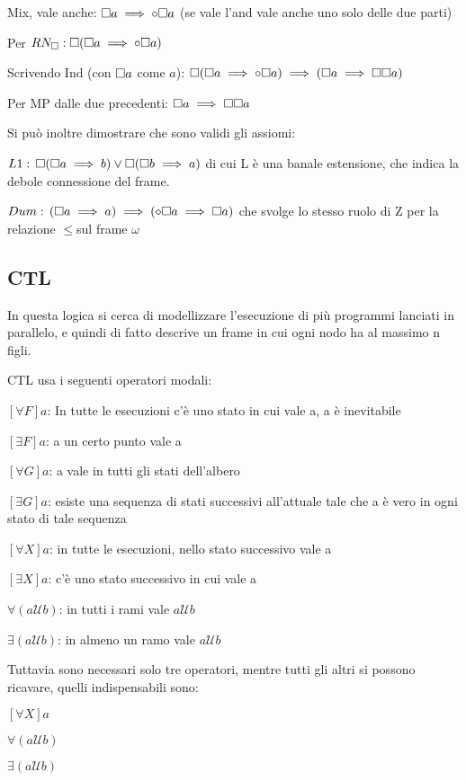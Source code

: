 Mix, vale anche: $\square a\implies\circ\square a$ (se vale l'and vale anche
uno solo delle due parti)

Per $RN_{\square}:\square(\square a\implies\circ\square a)$

Scrivendo Ind (con $\square a$ come $a$): $\square(\square a\implies\circ\square a)\implies(\square a\implies\square\square a)$ 

Per MP dalle due precedenti: $\square a\implies\square\square a$

Si può inoltre dimostrare che sono validi gli assiomi:

$L1:\,\square(\square a\implies b)\vee\square(\square b\implies a)$ di cui
L è una banale estensione, che indica la debole connessione del frame.

$Dum:\,(\square a\implies a)\implies(\diamond\square a\implies\square a)$ che svolge
lo stesso ruolo di Z per la relazione $\leq$sul frame $\omega$


\subsection{CTL}

In questa logica si cerca di modellizzare l'esecuzione di più programmi
lanciati in parallelo, e quindi di fatto descrive un frame in cui
ogni nodo ha al massimo n figli.

CTL usa i seguenti operatori modali:

$[\forall F]a$: In tutte le esecuzioni c'è uno stato in cui vale
a, a è inevitabile

$[\exists F]a$: a un certo punto vale a

$[\forall G]a$: a vale in tutti gli stati dell'albero

$[\exists G]a$: esiste una sequenza di stati successivi all'attuale
tale che a è vero in ogni stato di tale sequenza

$[\forall X]a$: in tutte le esecuzioni, nello stato successivo vale
a

$[\exists X]a$: c'è uno stato successivo in cui vale a

$\forall(a\mathcal{U}b)$: in tutti i rami vale $a\mathcal{U}b$

$\exists(a\mathcal{U}b)$: in almeno un ramo vale $a\mathcal{U}b$

Tuttavia sono necessari solo tre operatori, mentre tutti gli altri
si possono ricavare, quelli indispensabili sono:

$[\forall X]a$

$\forall(a\mathcal{U}b)$

$\exists(a\mathcal{U}b)$

